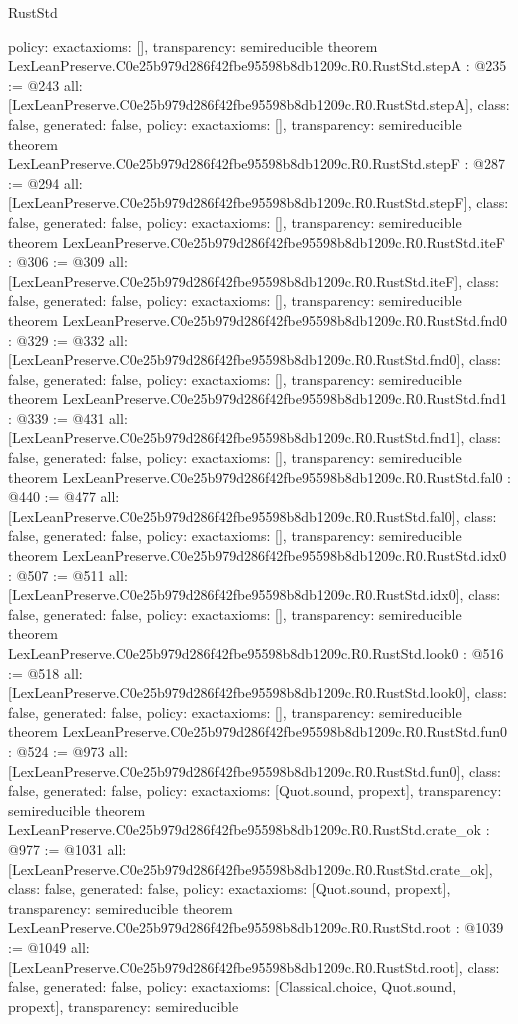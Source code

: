\begin{lexlean}{RustStd}
\begin{coremodule}
{  policy: exact{axioms: []},
  transparency: semireducible
}
theorem LexLeanPreserve.C0e25b979d286f42fbe95598b8db1209c.R0.RustStd.stepA : @235 := @243 {
  all: [LexLeanPreserve.C0e25b979d286f42fbe95598b8db1209c.R0.RustStd.stepA],
  class: false,
  generated: false,
  policy: exact{axioms: []},
  transparency: semireducible
}
theorem LexLeanPreserve.C0e25b979d286f42fbe95598b8db1209c.R0.RustStd.stepF : @287 := @294 {
  all: [LexLeanPreserve.C0e25b979d286f42fbe95598b8db1209c.R0.RustStd.stepF],
  class: false,
  generated: false,
  policy: exact{axioms: []},
  transparency: semireducible
}
theorem LexLeanPreserve.C0e25b979d286f42fbe95598b8db1209c.R0.RustStd.iteF : @306 := @309 {
  all: [LexLeanPreserve.C0e25b979d286f42fbe95598b8db1209c.R0.RustStd.iteF],
  class: false,
  generated: false,
  policy: exact{axioms: []},
  transparency: semireducible
}
theorem LexLeanPreserve.C0e25b979d286f42fbe95598b8db1209c.R0.RustStd.fnd0 : @329 := @332 {
  all: [LexLeanPreserve.C0e25b979d286f42fbe95598b8db1209c.R0.RustStd.fnd0],
  class: false,
  generated: false,
  policy: exact{axioms: []},
  transparency: semireducible
}
theorem LexLeanPreserve.C0e25b979d286f42fbe95598b8db1209c.R0.RustStd.fnd1 : @339 := @431 {
  all: [LexLeanPreserve.C0e25b979d286f42fbe95598b8db1209c.R0.RustStd.fnd1],
  class: false,
  generated: false,
  policy: exact{axioms: []},
  transparency: semireducible
}
theorem LexLeanPreserve.C0e25b979d286f42fbe95598b8db1209c.R0.RustStd.fal0 : @440 := @477 {
  all: [LexLeanPreserve.C0e25b979d286f42fbe95598b8db1209c.R0.RustStd.fal0],
  class: false,
  generated: false,
  policy: exact{axioms: []},
  transparency: semireducible
}
theorem LexLeanPreserve.C0e25b979d286f42fbe95598b8db1209c.R0.RustStd.idx0 : @507 := @511 {
  all: [LexLeanPreserve.C0e25b979d286f42fbe95598b8db1209c.R0.RustStd.idx0],
  class: false,
  generated: false,
  policy: exact{axioms: []},
  transparency: semireducible
}
theorem LexLeanPreserve.C0e25b979d286f42fbe95598b8db1209c.R0.RustStd.look0 : @516 := @518 {
  all: [LexLeanPreserve.C0e25b979d286f42fbe95598b8db1209c.R0.RustStd.look0],
  class: false,
  generated: false,
  policy: exact{axioms: []},
  transparency: semireducible
}
theorem LexLeanPreserve.C0e25b979d286f42fbe95598b8db1209c.R0.RustStd.fun0 : @524 := @973 {
  all: [LexLeanPreserve.C0e25b979d286f42fbe95598b8db1209c.R0.RustStd.fun0],
  class: false,
  generated: false,
  policy: exact{axioms: [Quot.sound, propext]},
  transparency: semireducible
}
theorem LexLeanPreserve.C0e25b979d286f42fbe95598b8db1209c.R0.RustStd.crate_ok : @977 := @1031 {
  all: [LexLeanPreserve.C0e25b979d286f42fbe95598b8db1209c.R0.RustStd.crate_ok],
  class: false,
  generated: false,
  policy: exact{axioms: [Quot.sound, propext]},
  transparency: semireducible
}
theorem LexLeanPreserve.C0e25b979d286f42fbe95598b8db1209c.R0.RustStd.root : @1039 := @1049 {
  all: [LexLeanPreserve.C0e25b979d286f42fbe95598b8db1209c.R0.RustStd.root],
  class: false,
  generated: false,
  policy: exact{axioms: [Classical.choice, Quot.sound, propext]},
  transparency: semireducible
}


\end{coremodule}
\end{lexlean}
